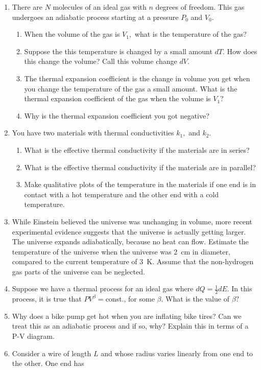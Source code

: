 \documentclass[12pt]{book}
\begin{document}
\begin{enumerate}
 \item There are $N$ molecules of an ideal gas with $n$ degrees of freedom. This gas undergoes an adiabatic process starting at a pressure $P_0$ and $V_0.$
 \begin{enumerate}
 \item When the volume of the gas is $V_1,$ what is the temperature of the gas?
 \item Suppose the this temperature is changed by a small amount $dT.$ How does this change the volume? Call this volume change $dV.$
 \item The thermal expansion coefficient is the change in volume you get when you change the temperature of the gas a small amount. What is the thermal expansion coefficient of the gas when the volume is $V_1?$
 \item Why is the thermal expansion coefficient you got negative?
 \end{enumerate}
  \item You have two materials with thermal conductivities $k_1,$ and $k_2.$
 \begin{enumerate}
  \item What is the effective thermal conductivity if the materials are in series?
  \item What is the effective thermal conductivity if the materials are in parallel?
  \item Make qualitative plots of the temperature in the materials if one end is in contact with a hot temperature and the other end with a cold temperature.
  \end{enumerate}
 \item While Einstein believed the universe was unchanging in volume, more recent experimental evidence suggests that the universe is actually getting larger. The universe expands adiabatically, because no heat can flow. Estimate the temperature of the universe when the universe was 2~cm in diameter, compared to the current temperature of 3~K. Assume that the non-hydrogen gas parts of the universe can be neglected.
 \item Suppose we have a thermal process for an ideal gas where $dQ = \frac{1}{2} dE.$ In this process, it is true that $PV^\beta=$const., for some $\beta.$ What is the value of $\beta?$
 \item Why does a bike pump get hot when you are inflating bike tires? Can we treat this as an adiabatic process and if so, why? Explain this in terms of a P-V diagram.
 \item Consider a wire of length $L$ and whose radius varies linearly from one end to the other. One end has

\end{enumerate}
\end{document}
